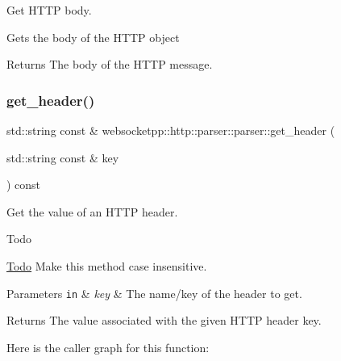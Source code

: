 Get H\+T\+TP body. 

Gets the body of the H\+T\+TP object

\begin{DoxyReturn}{Returns}
The body of the H\+T\+TP message. 
\end{DoxyReturn}
\mbox{\label{classwebsocketpp_1_1http_1_1parser_1_1parser_ae8a8f833c3fb01f1553a26e77f380367}} 
\subsubsection{\texorpdfstring{get\+\_\+header()}{get\_header()}}
{\footnotesize\ttfamily std\+::string const  \& websocketpp\+::http\+::parser\+::parser\+::get\+\_\+header (\begin{DoxyParamCaption}\item[{std\+::string const \&}]{key }\end{DoxyParamCaption}) const\hspace{0.3cm}{\ttfamily [inline]}}



Get the value of an H\+T\+TP header. 

\begin{DoxyRefDesc}{Todo}
\item[\mbox{\hyperlink{todo__todo000016}{Todo}}]Make this method case insensitive.\end{DoxyRefDesc}



\begin{DoxyParams}[1]{Parameters}
\mbox{\tt in}  & {\em key} & The name/key of the header to get. \\
\hline
\end{DoxyParams}
\begin{DoxyReturn}{Returns}
The value associated with the given H\+T\+TP header key. 
\end{DoxyReturn}
Here is the caller graph for this function\+:
\mbox{\label{classwebsocketpp_1_1http_1_1parser_1_1parser_a42ab85c14bef2028d1e6f050af1140ce}} 
